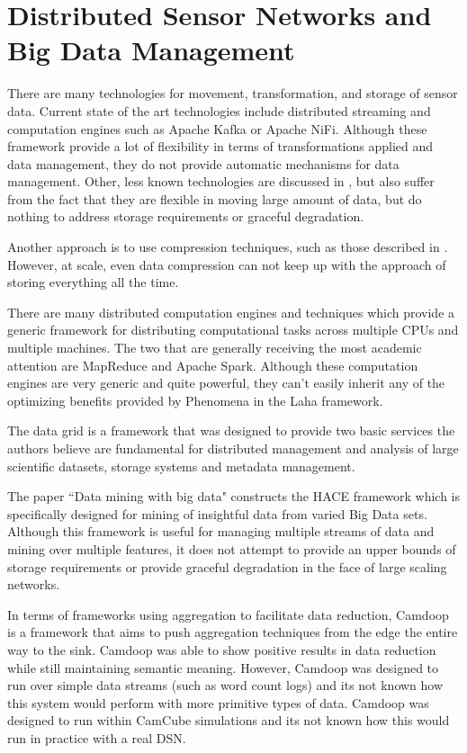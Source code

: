 \section{Distributed Sensor Networks and Big Data Management}
There are many technologies for movement, transformation, and storage of sensor data. Current state of the art technologies include distributed streaming and computation engines such as Apache Kafka\cite{kreps2011kafka} or Apache NiFi\cite{noauthor_apache_nodate}. Although these framework provide a lot of flexibility in terms of transformations applied and data management, they do not provide automatic mechanisms for data management. Other, less known technologies are discussed in \cite{hughes2016survey}, but also suffer from the fact that they are flexible in moving large amount of data, but do nothing to address storage requirements or graceful degradation.

Another approach is to use compression techniques, such as those described in \cite{tang2004compression}. However, at scale, even data compression can not keep up with the approach of storing everything all the time.

There are many distributed computation engines and techniques which provide a generic framework for distributing computational tasks across multiple CPUs and multiple machines. The two that are generally receiving the most academic attention are MapReduce\cite{dean2008mapreduce} and Apache Spark\cite{zaharia2016apache}. Although these computation engines are very generic and quite powerful, they can't easily inherit any of the optimizing benefits provided by Phenomena in the Laha framework.

The data grid\cite{chervenak2000data} is a framework that was designed to provide two basic services the authors believe are fundamental for distributed management and analysis of large scientific datasets, storage systems and metadata management. 

The paper ``Data mining with big data"\cite{wu2014data} constructs the HACE framework which is specifically designed for mining of insightful data from varied Big Data sets. Although this framework is useful for managing multiple streams of data and mining over multiple features, it does not attempt to provide an upper bounds of storage requirements or provide graceful degradation in the face of large scaling networks.

In terms of frameworks using aggregation to facilitate data reduction, Camdoop\cite{costa2012camdoop} is a framework that aims to push aggregation techniques from the edge the entire way to the sink. Camdoop was able to show positive results in data reduction while still maintaining semantic meaning. However, Camdoop was designed to run over simple data streams (such as word count logs) and its not known how this system would perform with more primitive types of data. Camdoop was designed to run within CamCube simulations and its not known how this would run in practice with a real DSN.

